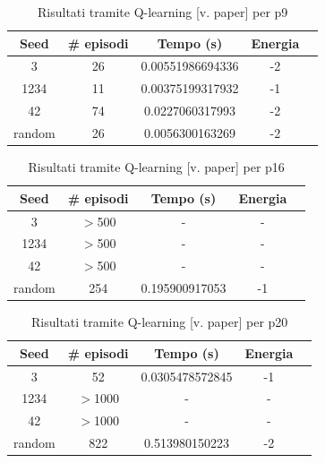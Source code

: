 \documentclass[conference]{IEEEtran}
\begin{document}
\begin{table}[H]
\begin{center}
\begin{tabular}{|c|c|c|c|c|}
\hline
\textbf{Seed} & \textbf{\# episodi} & \textbf{Tempo (s)} & \textbf{Energia} \\ \hline
3 & 26 & 0.00551986694336 & -2 \\ \hline
1234 & 11 & 0.00375199317932 & -1 \\ \hline
42 & 74 & 0.0227060317993 & -2 \\ \hline
random & 26 & 0.0056300163269 & -2 \\ \hline
\end{tabular}
\end{center}
\caption{Risultati tramite Q-learning [v. paper] per p9}
\end{table}

\begin{table}[H]
\begin{center}
\begin{tabular}{|c|c|c|c|c|}
\hline
\textbf{Seed} & \textbf{\# episodi} & \textbf{Tempo (s)} & \textbf{Energia} \\ \hline
3 & $>$500 & - & - \\ \hline
1234 & $>$500 & - & - \\ \hline
42 & $>$500 & - & - \\ \hline
random & 254 & 0.195900917053 & -1 \\ \hline
\end{tabular}
\end{center}
\caption{Risultati tramite Q-learning [v. paper] per p16}
\end{table}

\begin{table}[H]
\begin{center}
\begin{tabular}{|c|c|c|c|c|}
\hline
\textbf{Seed} & \textbf{\# episodi} & \textbf{Tempo (s)} & \textbf{Energia} \\ \hline
3 & 52 & 0.0305478572845 & -1 \\ \hline
1234 & $>$1000 & - & - \\ \hline
42 & $>$1000 & - & - \\ \hline
random & 822 & 0.513980150223 & -2 \\ \hline
\end{tabular}
\end{center}
\caption{Risultati tramite Q-learning [v. paper] per p20}
\end{table}
\end{document}
